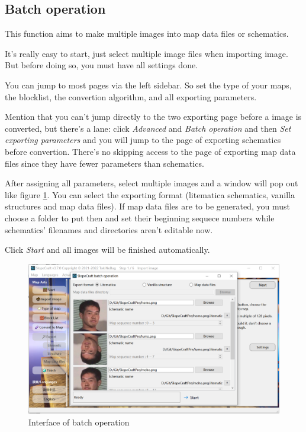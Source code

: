 \documentclass{article}
\begin{document}
   \subsection{Batch operation}
   \label{BatchOp}
   This function aims to make multiple images into map data files or schematics.

   It's really easy to start, just select multiple image files when importing image. But before doing so, you must have all settings done.

   You can jump to most pages via the left sidebar. So set the type of your maps, the blocklist, the convertion algorithm, and all exporting parameters. 
   
   Mention that you can't jump directly to the two exporting page before a image is converted, but there's a lane: click \textit{Advanced} and \textit{Batch operation} and then \textit{Set exporting parameters} and you will jump to the page of exporting schematics before convertion. There's no skipping access to the page of exporting map data files since they have fewer parameters than schematics.

   After assigning all parameters, select multiple images and a window will pop out like figure \ref*{BatchUi}. You can select the exporting format (litematica schematics, vanilla structures and map data files). If map data files are to be generated, you must choose a folder to put then and set their beginning sequece numbers while schematics' filenames and directories aren't editable now.

   Click \textit{Start} and all images will be finished automatically.

   \begin{figure}[htbp]
       \centering
       \includegraphics[width=15cm]{Img12_BatchOp.png}
       \caption{Interface of batch operation}
       \label{BatchUi}
   \end{figure}
   
\end{document}
